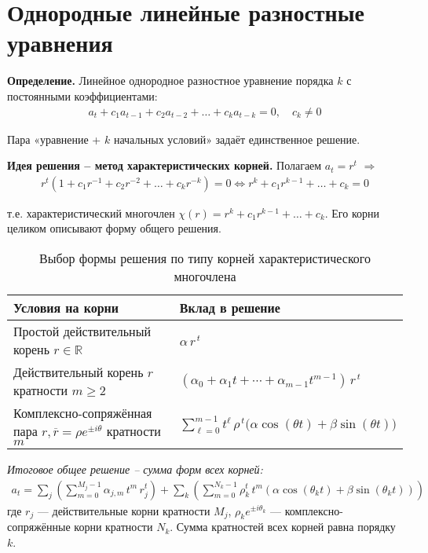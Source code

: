\section{Однородные линейные разностные уравнения}\label{sec:homogeneous}

\begin{center}
\end{center}

\textbf{Определение.} Линейное однородное разностное уравнение порядка $k$ с постоянными коэффициентами:
\begin{align}
a_t + c_1 a_{t-1} + c_2 a_{t-2} + \dots + c_k a_{t-k} = 0, \quad c_k \neq 0
\end{align}

Пара «уравнение + $k$ начальных условий» задаёт единственное решение.

\textbf{Идея решения -- метод характеристических корней.} Полагаем $a_t = r^t$ $\Rightarrow$
\begin{align}
r^t (1 + c_1 r^{-1} + c_2 r^{-2} + \dots + c_k r^{-k}) = 0 \iff r^k + c_1 r^{k-1} + \dots + c_k = 0
\end{align}

т.е. характеристический многочлен $\chi(r) = r^k + c_1 r^{k-1} + \dots + c_k$. Его корни целиком описывают форму общего решения.

\begin{table}[h!]
\centering
\caption{Выбор формы решения по типу корней характеристического многочлена}
\label{tab:form-choices}
\begin{tabular}{|l|l|}
\hline
\textbf{Условия на корни} & \textbf{Вклад в решение} \\
\hline
Простой действительный корень $r\in\mathbb{R}$ &
$\alpha\, r^{\,t}$ \\
\hline
Действительный корень $r$ кратности $m\ge 2$ &
$(\alpha_{0}+\alpha_{1}t+\cdots+\alpha_{m-1}t^{m-1})\, r^{\,t}$ \\
\hline
Комплексно-сопряжённая пара $r,\overline{r}=\rho e^{\pm i\theta}$ кратности $m$ &
$\displaystyle \sum_{\ell=0}^{m-1} t^{\ell}\,\rho^{\,t}\big(\alpha\cos(\theta t)+\beta\sin(\theta t)\big)$ \\
\hline
\end{tabular}

\vspace{0.5em}
\emph{Итоговое общее решение -- сумма форм всех корней:}
\begin{align*}
a_t = \sum_{j} \left( \sum_{m=0}^{M_j-1} \alpha_{j,m}\, t^m\, r_j^t \right)
+ \sum_{k} \left( \sum_{m=0}^{N_k-1} \rho_k^t\, t^m \left( \alpha \cos(\theta_k t) + \beta \sin(\theta_k t) \right) \right)
\end{align*}
где $r_j$ — действительные корни кратности $M_j$, $\rho_k e^{\pm i\theta_k}$ — комплексно-сопряжённые корни кратности $N_k$.
Сумма кратностей всех корней равна порядку $k$.
\end{table}

